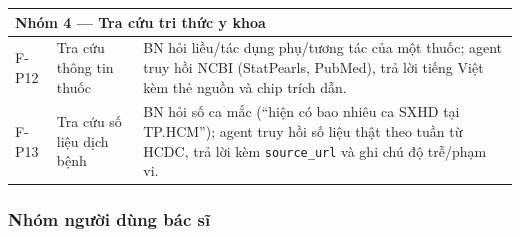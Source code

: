 \documentclass[a4paper,13pt,3p,oneside]{report}
\theoremstyle{definition}
\theoremstyle{remark}
\theoremstyle{definition}
\begin{document}
\begin{table}[H]
\begin{tabular}{|l|p{4cm}|p{8cm}|}
\hline
\multicolumn{3}{|l|}{\textbf{Nhóm 4 --- Tra cứu tri thức y khoa}} \\
\hline
F-P12 & Tra cứu thông tin thuốc & BN hỏi liều/tác dụng phụ/tương tác của một thuốc; agent truy hồi NCBI (StatPearls, PubMed), trả lời tiếng Việt kèm thẻ nguồn và chip trích dẫn. \\
\hline
F-P13 & Tra cứu số liệu dịch bệnh & BN hỏi số ca mắc (``hiện có bao nhiêu ca SXHD tại TP.HCM''); agent truy hồi số liệu thật theo tuần từ HCDC, trả lời kèm \texttt{source\_url} và ghi chú độ trễ/phạm vi. \\
\hline
\end{tabular}
\end{table}

\subsubsection{Nhóm người dùng bác sĩ}
\end{document}
